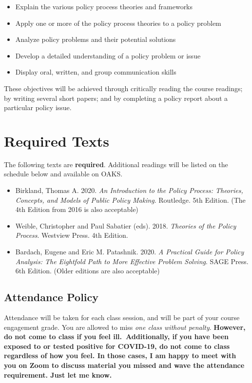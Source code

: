 \begin{itemize}
\item
  Explain the various policy process theories and frameworks
\item
  Apply one or more of the policy process theories to a policy problem
\item
  Analyze policy problems and their potential solutions
\item
  Develop a detailed understanding of a policy problem or issue
\item
  Display oral, written, and group communication skills
\end{itemize}

\vspace{0.10in}

\noindent These objectives will be achieved through critically reading
the course readings; by writing several short papers; and by completing
a policy report about a particular policy issue.

\hypertarget{required-texts}{%
\section{Required Texts}\label{required-texts}}

The following texts are \textbf{required}. Additional readings will be
listed on the schedule below and available on OAKS.

\begin{itemize}
\item
  Birkland, Thomas A. 2020. \emph{An Introduction to the Policy Process:
  Theories, Concepts, and Models of Public Policy Making}. Routledge.
  5th Edition. (The 4th Edition from 2016 is also acceptable)
\item
  Weible, Christopher and Paul Sabatier (eds). 2018. \emph{Theories of
  the Policy Process}. Westview Press. 4th Edition.
\item
  Bardach, Eugene and Eric M. Patashnik. 2020. \emph{A Practical Guide
  for Policy Analysis: The Eightfold Path to More Effective Problem
  Solving}. SAGE Press. 6th Edition. (Older editions are also
  acceptable)
\end{itemize}

\hypertarget{attendance-policy}{%
\subsection{Attendance Policy}\label{attendance-policy}}

Attendance will be taken for each class session, and will be part of
your course engagement grade. You are allowed to miss \emph{one class
without penalty}. \textbf{However, do not come to class if you feel
ill.~Additionally, if you have been exposed to or tested positive for
COVID-19, do not come to class regardless of how you feel. In those
cases, I am happy to meet with you on Zoom to discuss material you
missed and wave the attendance requirement. Just let me know.}

